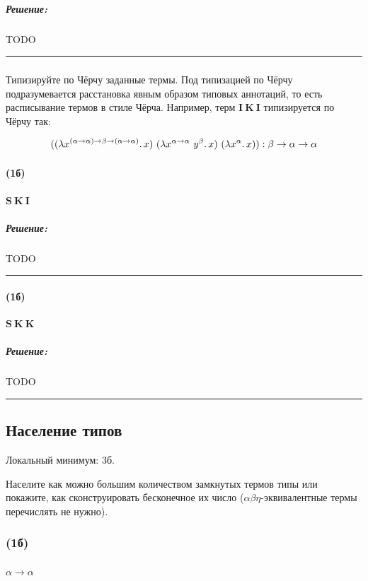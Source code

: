 \documentclass{article}
\newenvironment{proof}{\subparagraph{\hspace{-1em}Решение:\newline}}{\par\noindent\rule{\textwidth}{0.4pt}}
\newcommand{\term}[1]{\mathbf{#1}}
\newcommand{\ap}{~}
\begin{document}
    \begin{proof}
        TODO %
    \end{proof}

    \subsubsection{}

    Типизируйте по Чёрчу заданные термы.
    Под типизацией по Чёрчу подразумевается
    расстановка явным образом типовых аннотаций, то есть расписывание термов в стиле
    Чёрча.
    Например, терм $\term{I} \ap \term{K} \ap \term{I}$ типизируется по Чёрчу
    так:

    \[((\lambda x^{(\alpha \to \alpha) \to \beta \to (\alpha \to \alpha)}\ldotp x) \ap (\lambda x^{\alpha \to \alpha} \ap y^\beta\ldotp x) \ap (\lambda x^\alpha\ldotp x)):
    \beta \to \alpha \to \alpha\]

    \paragraph{(1б)} $\term{S} \ap \term{K} \ap \term{I}$

    \begin{proof}
        TODO %
    \end{proof}

    \paragraph{(1б)} $\term{S} \ap \term{K} \ap \term{K}$

    \begin{proof}
        TODO %
    \end{proof}

    \subsection{Население типов}

    Локальный минимум: 3б.

    Населите как можно большим количеством замкнутых термов типы или покажите, как
    сконструировать бесконечное их число ($\alpha\beta\eta$-эквивалентные
    термы перечислять не нужно).

    \subsubsection{(1б)}

    \paragraph{} $\alpha \to \alpha$
\end{document}
